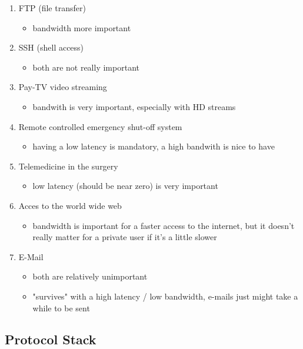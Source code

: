 \documentclass[a4paper,12pt]{article}
\begin{document}
 
 \begin{enumerate}[itemsep=0pt]
	 \item FTP (file transfer)
	  \begin{itemize}[itemsep=0pt]
	 	\item bandwidth more important
	  \end{itemize} 
	 \item SSH (shell access)
		\begin{itemize}[itemsep=0pt]
		 	\item both are not really important
	 	\end{itemize}  
	 \item Pay-TV video streaming
	 \begin{itemize}[itemsep=0pt]
	 	\item bandwith is very important, especially with HD streams
	 \end{itemize}  
	 \item Remote controlled emergency shut-off system
	 \begin{itemize}[itemsep=0pt]
	 	\item having a low latency is mandatory, a high bandwith is nice to have
	 \end{itemize}
	 \item Telemedicine in the surgery
	 \begin{itemize}[itemsep=0pt]
	 	\item low latency (should be near zero) is very important
	 \end{itemize}
	 \item Acces to the world wide web
	 \begin{itemize}[itemsep=0pt]
	 	\item bandwidth is important for a faster access to the internet, but it doesn't really matter for a private user if it's a little slower
	 \end{itemize}
	 \item E-Mail
	 \begin{itemize}[itemsep=0pt]
	 	\item both are relatively unimportant
	 	\item "survives" with a high latency / low bandwidth, e-mails just might take a while to be sent
	 \end{itemize}
 \end{enumerate}

 \subsection{Protocol Stack}
\end{document}
